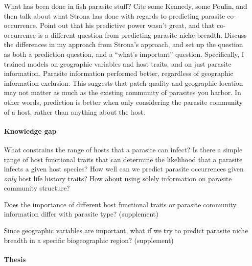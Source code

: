 \documentclass[12pt]{article}
\begin{document}
What has been done in fish parasite stuff? Cite some Kennedy, some Poulin, and then talk about what Strona has done with regards to predicting parasite co-occurrence. Point out that his predictive power wasn't great, and that co-occurrence is a different question from predicting parasite niche breadth. Discuss the differences in my approach from Strona's approach, and set up the question as both a prediction question, and a ``what's important'' question. Specifically, I trained models on geographic variables and host traits, and on just parasite information. Parasite information performed better, regardless of geographic information exclusion. This suggests that patch quality and geographic location may not matter as much as the existing community of parasites you harbor. In other words, prediction is better when only considering the parasite community of a host, rather than anything about the host. 



 \paragraph{Knowledge gap}

What constrains the range of hosts that a parasite can infect? Is there a simple range of host functional traits that can determine the likelihood that a parasite infects a given host species? How well can we predict parasite occurrences given \textit{only} host life history traits? How about using solely information on parasite community structure? 




Does the importance of different host functional traits or parasite community information differ with parasite type? (supplement)

Since geographic variables are important, what if we try to predict parasite niche breadth in a specific biogeographic region? (supplement)


 
 \paragraph{Thesis}
 
\end{document}
